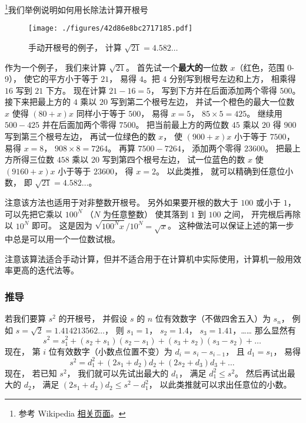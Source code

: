 
\footnote{参考 Wikipedia \href{https://en.wikipedia.org/wiki/Methods_of_computing_square_roots}{相关页面}。}我们举例说明如何用长除法计算开根号
\begin{example}{}
\begin{figure}[ht]
\centering
\texttt{[image: ./figures/42d86e8bc2717185.pdf]}
\caption{手动开根号的例子， 计算 $\sqrt{21} = 4.582\dots$} \label{fig_Hsqrt_1}
\end{figure}
作为一个例子， 我们来计算 $\sqrt{21}$。 首先试一个\textbf{最大的}一位数 $x$（红色，范围 0-9）， 使它的平方小于等于 $21$， 易得 $4$。把 $4$ 分别写到根号左边和上方， 相乘得 $16$ 写到 $21$ 下方。 现在计算 $21-16 = 5$， 写到下方并在后面添加两个零得 $500$。 接下来把最上方的 $4$ 乘以 $20$ 写到第二个根号左边， 并试一个橙色的最大一位数 $x$ 使得 $(80+x) x$ 同样小于等于 $500$， 易得 $x = 5$， $85\times 5 = 425$。 继续用 $500-425$ 并在后面加两个零得 $7500$。 把当前最上方的两位数 $45$ 乘以 $20$ 得 $900$ 写到第三个根号左边， 再试一位绿色的数 $x$， 使 $(900+ x) x$ 小于等于 $7500$， 易得 $x = 8$， $908\times 8 = 7264$。 再算 $7500-7264$， 添加两个零得 $23600$。 把最上方所得三位数 $458$ 乘以 $20$ 写到第四个根号左边， 试一位蓝色的数 $x$ 使 $(9160+x)x$ 小于等于 $23600$， 得 $x = 2$。 以此类推， 就可以精确到任意位小数， 即 $\sqrt{21} = 4.582\dots$。

注意该方法也适用于对非整数开根号。 另外如果要开根的数大于 $100$ 或小于 $1$， 可以先把它乘以 $100^{N}$ （$N$ 为任意整数） 使其落到 $1$ 到 $100$ 之间， 开完根后再除以 $10^N$ 即可。 这是因为 $\sqrt{100^{N} x}/10^N =  \sqrt{x}$。 这种做法可以保证上述的第一步中总是可以用一个一位数试根。
\end{example}

注意该算法适合手动计算，但并不适合用于在计算机中实际使用，计算机一般用效率更高的迭代法等。

\subsubsection{推导}
若我们要算 $s^2$ 的开根号， 并假设 $s$ 的 $n$ 位有效数字（不做四舍五入）为 $s_n$， 例如 $s = \sqrt{2} = 1.414213562\dots$， 则 $s_1 = 1$， $s_2=1.4$， $s_3=1.41$，…… 那么显然有
\begin{equation}
s^2 = s_1^2 + (s_2+s_1)(s_2-s_1) + (s_3+s_2)(s_3-s_2) + \dots~
\end{equation}
现在， 第 $i$ 位有效数字（小数点位置不变）为 $d_i = s_i-s_{i-1}$， 且 $d_1 = s_1$， 易得
\begin{equation}
s^2 = d_1^2 + (2s_1 + d_2)d_2 + (2s_2 + d_3)d_3 + \dots~
\end{equation}
现在， 若已知 $s^2$， 我们就可以先试出最大的 $d_1$， 满足 $d_1^2\leqslant s^2$。 然后再试出最大的 $d_2$， 满足 $(2s_1 + d_2)d_2 \leqslant s^2 - d_1^2$， 以此类推就可以求出任意位的小数。

